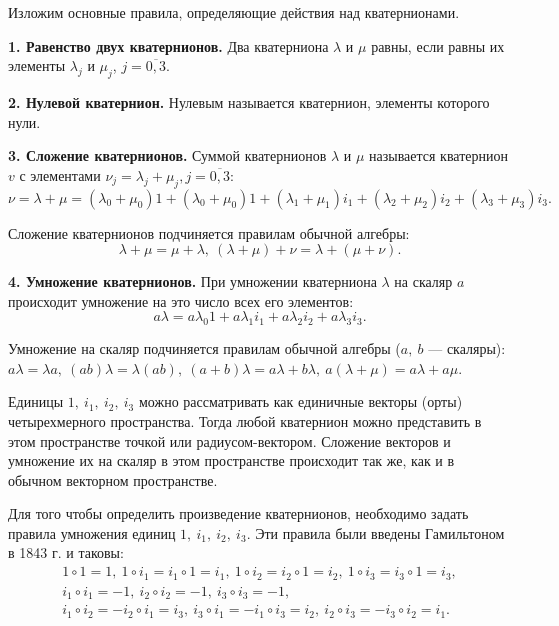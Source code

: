 \documentclass[14pt]{extreport}
\begin{document}
Изложим основ­ные правила, определяющие действия над кватернионами.

\textbf{1. Равенство двух кватернионов.} Два кватерниона $\lambda$ и $\mu$ равны, если равны их элементы $\lambda_{j}$ и $\mu_{j}$, $j = \overline{0,3}$.

\textbf{2. Нулевой кватернион.} Нулевым называется кватернион, элементы которого нули.

\textbf{3. Сложение кватернионов.} Суммой кватернионов $\lambda$ и $\mu$ называется кватернион $v$ с элементами $\nu_{j} = \lambda_{j} + \mu_{j}, j = \overline{0,3}$:
\begin{equation}
\label{sum-quat}
\nu = \lambda + \mu = (\lambda_{0} + \mu_{0}) 1 + (\lambda_{0} + \mu_{0}) 1 + (\lambda_{1} + \mu_{1}) i_{1} + (\lambda_{2} + \mu_{2}) i_{2} + (\lambda_{3} + \mu_{3}) i_{3}.
\end{equation}

Сложение кватернионов подчиняется правилам обычной алгебры:
\begin{equation}
\label{sum-quat-algebra}
\lambda + \mu = \mu + \lambda,\ (\lambda + \mu)+\nu = \lambda + (\mu+\nu).
\end{equation}

\textbf{4. Умножение кватернионов.} При умножении кватерниона $\lambda$ на скаляр $a$ происходит умножение на это число всех его элементов:
\begin{equation}
\label{scal-mul-quat}
a\lambda=a\lambda_{0}1+a\lambda_{1}i_{1}+a\lambda_{2}i_{2}+a\lambda_{3}i_{3}.
\end{equation}

Умножение на скаляр подчиняется правилам обычной алгебры ($a,\ b$ — скаляры): $a\lambda = \lambda a,\ (ab)\lambda = \lambda(ab),\ (a + b)\lambda = a\lambda + b\lambda,\ a(\lambda + \mu) = a\lambda + a\mu.$

Единицы $1,\ i_{1},\ i_{2},\ i_{3}$ можно рассматривать как единичные векторы (орты) четырехмерного пространства. Тогда любой кватернион можно представить в этом пространстве точкой или радиусом-вектором. Сложение векторов и умножение их на скаляр в этом пространстве происходит так же, как и в обычном векторном пространстве.

Для того чтобы определить произведение кватернионов, необходимо задать правила умножения единиц $1,\ i_{1},\ i_{2},\ i_{3}$. Эти правила были введены Гамильтоном в 1843 г. и таковы:
\begin{equation}
\label{H-rules}
\begin{split}
1\circ 1 = 1,\ 1\circ i_{1} = i_{1} \circ 1 = i_{1},\ 1\circ i_{2} = i_{2} \circ 1 = i_{2},\ 1\circ i_{3} = i_{3} \circ 1 = i_{3},\\
i_{1}\circ i_{1} = -1,\ i_{2}\circ i_{2} = -1,\ i_{3}\circ i_{3} = -1,\\
i_{1}\circ i_{2} = -i_{2}\circ i_{1} = i_{3},\ i_{3}\circ i_{1} = -i_{1}\circ i_{3} = i_{2},\ i_{2}\circ i_{3} = -i_{3}\circ i_{2} = i_{1}.
\end{split}
\end{equation}
\end{document}
